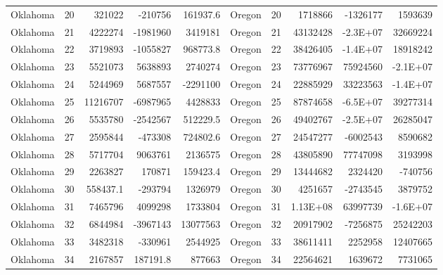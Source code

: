 \begin{landscape}
\begin{singlespace}
\begin{longtable}{lrrrr|lrrrr}
		Oklahoma &  20 & 321022 & -210756 & 161937.6 & Oregon &  20 & 1718866 & -1326177 & 1593639 \\
		Oklahoma &  21 & 4222274 & -1981960 & 3419181 & Oregon &  21 & 43132428 & -2.3E+07 & 32669224 \\
		Oklahoma &  22 & 3719893 & -1055827 & 968773.8 & Oregon &  22 & 38426405 & -1.4E+07 & 18918242 \\
		Oklahoma &  23 & 5521073 & 5638893 & 2740274 & Oregon &  23 & 73776967 & 75924560 & -2.1E+07 \\
		Oklahoma &  24 & 5244969 & 5687557 & -2291100 & Oregon &  24 & 22885929 & 33223563 & -1.4E+07 \\
		Oklahoma &  25 & 11216707 & -6987965 & 4428833 & Oregon &  25 & 87874658 & -6.5E+07 & 39277314 \\
		Oklahoma &  26 & 5535780 & -2542567 & 512229.5 & Oregon &  26 & 49402767 & -2.5E+07 & 26285047 \\
		Oklahoma &  27 & 2595844 & -473308 & 724802.6 & Oregon &  27 & 24547277 & -6002543 & 8590682 \\
		Oklahoma &  28 & 5717704 & 9063761 & 2136575 & Oregon &  28 & 43805890 & 77747098 & 3193998 \\
		Oklahoma &  29 & 2263827 & 170871 & 159423.4 & Oregon &  29 & 13444682 & 2324420 & -740756 \\
		Oklahoma &  30 & 558437.1 & -293794 & 1326979 & Oregon &  30 & 4251657 & -2743545 & 3879752 \\
		Oklahoma &  31 & 7465796 & 4099298 & 1733804 & Oregon &  31 & 1.13E+08 & 63997739 & -1.6E+07 \\
		Oklahoma &  32 & 6844984 & -3967143 & 13077563 & Oregon &  32 & 20917902 & -7256875 & 25242203 \\
		Oklahoma &  33 & 3482318 & -330961 & 2544925 & Oregon &  33 & 38611411 & 2252958 & 12407665 \\
		Oklahoma &  34 & 2167857 & 187191.8 & 877663 & Oregon &  34 & 22564621 & 1639672 & 7731065\\


\end{longtable}
\end{singlespace}
\end{landscape}
